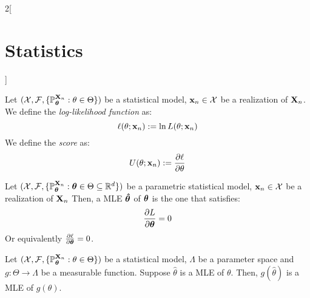 \documentclass[../../../main.tex]{subfiles}
\begin{document}
\begin{multicols}{2}[\section{Statistics}]
\begin{definition}
  \end{definition}
  \begin{definition}
    Let $(\mathcal{X},\mathcal{F},\{\mathbb{P}_{\boldsymbol{\mathrm{\theta}}}^{\boldsymbol{\mathrm{X}}_n}:\theta\in\Theta\})$ be a statistical model, $\boldsymbol{\mathrm{x}}_n\in\mathcal{X}$ be a realization of $\boldsymbol{\mathrm{X}}_n$. We define the \emph{log-likelihood function} as: $$\ell(\theta;\boldsymbol{\mathrm{x}}_n):=\ln L(\theta;\boldsymbol{\mathrm{x}}_n)$$
    We define the \emph{score} as: $$U(\theta;\boldsymbol{\mathrm{x}}_n):=\pdv{\ell}{\theta}(\theta,\boldsymbol{\mathrm{x}}_n)$$
  \end{definition}
  \begin{proposition}
    Let $(\mathcal{X},\mathcal{F},\{\mathbb{P}_{\boldsymbol{\mathrm{\theta}}}^{\boldsymbol{\mathrm{X}}_n}:\boldsymbol{\mathrm{\theta}}\in\Theta\subseteq \mathbb{R}^d\})$ be a parametric statistical model, $\boldsymbol{\mathrm{x}}_n\in\mathcal{X}$ be a realization of $\boldsymbol{\mathrm{X}}_n$ Then, a MLE $\boldsymbol{\mathrm{\hat\theta}}$ of $\boldsymbol{\mathrm{\theta}}$ is the one that satisfies:
    $$\pdv{L}{\boldsymbol{\mathrm{\theta}}}(\boldsymbol{\mathrm{\hat\theta}};\boldsymbol{\mathrm{x}}_n)=0$$
    Or equivalently $\pdv{\ell}{\boldsymbol{\mathrm{\theta}}}(\boldsymbol{\mathrm{\hat\theta}};\boldsymbol{\mathrm{x}}_n)=0$.
  \end{proposition}
  \begin{proposition}
    Let $(\mathcal{X},\mathcal{F},\{\mathbb{P}_{\boldsymbol{\mathrm{\theta}}}^{\boldsymbol{\mathrm{X}}_n}:\theta\in\Theta\})$ be a statistical model, $\Lambda$ be a parameter space and $g:\Theta\rightarrow\Lambda$ be a measurable function. Suppose $\hat\theta$ is a MLE of $\theta$. Then, $g(\hat\theta)$ is a MLE of $g(\theta)$.
  \end{proposition}

\end{multicols}
\end{document}
